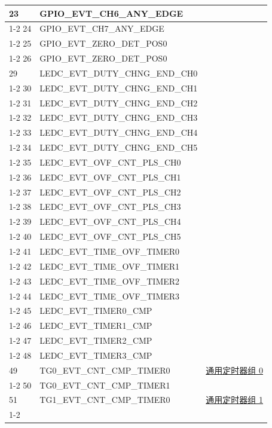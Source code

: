 \documentclass[main\_\_CN.tex]{subfiles}
\begin{document}
\begin{longtable}{ | l | l | l | }
23  & GPIO\_EVT\_CH6\_ANY\_EDGE &  \\ \cline{1-2}
24  & GPIO\_EVT\_CH7\_ANY\_EDGE &  \\ \cline{1-2}
25  & GPIO\_EVT\_ZERO\_DET\_POS0 &  \\ \cline{1-2}
26  & GPIO\_EVT\_ZERO\_DET\_POS0 &  \\ \hline
29  & LEDC\_EVT\_DUTY\_CHNG\_END\_CH0  & \nameref{mod:ledpwm}\\ \cline{1-2}
30  & LEDC\_EVT\_DUTY\_CHNG\_END\_CH1  & \\ \cline{1-2}
31  & LEDC\_EVT\_DUTY\_CHNG\_END\_CH2  & \\ \cline{1-2}
32  & LEDC\_EVT\_DUTY\_CHNG\_END\_CH3  & \\ \cline{1-2}
33  & LEDC\_EVT\_DUTY\_CHNG\_END\_CH4  & \\ \cline{1-2}
34  & LEDC\_EVT\_DUTY\_CHNG\_END\_CH5  & \\ \cline{1-2}
35  & LEDC\_EVT\_OVF\_CNT\_PLS\_CH0    & \\ \cline{1-2}
36  & LEDC\_EVT\_OVF\_CNT\_PLS\_CH1    & \\ \cline{1-2}
37  & LEDC\_EVT\_OVF\_CNT\_PLS\_CH2    & \\ \cline{1-2}
38  & LEDC\_EVT\_OVF\_CNT\_PLS\_CH3    & \\ \cline{1-2}
39  & LEDC\_EVT\_OVF\_CNT\_PLS\_CH4    & \\ \cline{1-2}
40  & LEDC\_EVT\_OVF\_CNT\_PLS\_CH5    & \\ \cline{1-2}
41  & LEDC\_EVT\_TIME\_OVF\_TIMER0     & \\ \cline{1-2}
42  & LEDC\_EVT\_TIME\_OVF\_TIMER1     & \\ \cline{1-2}
43  & LEDC\_EVT\_TIME\_OVF\_TIMER2     & \\ \cline{1-2}
44  & LEDC\_EVT\_TIME\_OVF\_TIMER3     & \\ \cline{1-2}
45  & LEDC\_EVT\_TIMER0\_CMP    & \\ \cline{1-2}
46  & LEDC\_EVT\_TIMER1\_CMP    & \\ \cline{1-2}
47  & LEDC\_EVT\_TIMER2\_CMP    & \\ \cline{1-2}
48  & LEDC\_EVT\_TIMER3\_CMP    & \\ \hline
49  & TG0\_EVT\_CNT\_CMP\_TIMER0    & \hyperref[mod:timg]{通用定时器组 0}   \\ \cline{1-2}
50  & TG0\_EVT\_CNT\_CMP\_TIMER1    & \\ \hline
51  & TG1\_EVT\_CNT\_CMP\_TIMER0    & \hyperref[mod:timg]{通用定时器组 1}   \\ \cline{1-2}

\end{longtable}
\end{document}
